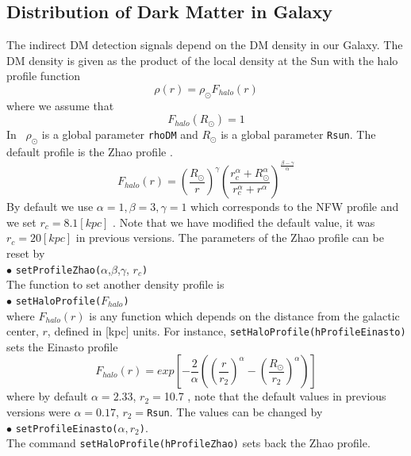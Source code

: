 \documentclass[12pt,a4paper]{article}
\begin{document}
\subsection{Distribution of Dark Matter  in Galaxy}
The indirect DM detection signals depend on the DM density in our Galaxy.
The DM density is given as the product of the local density at the Sun with the halo profile function 
\begin{equation}
\rho(r)=\rho_\odot F_{halo}(r)
\end{equation}
where we assume that
\begin{equation}
   F_{halo}(R_\odot)=1
\end{equation} 
In \micro\, $\rho_\odot$ is a global parameter {\tt rhoDM} and $R_\odot$ is a global parameter {\tt Rsun}.
  The default profile is the  Zhao  profile  \cite{Zhao:1995cp}.
\begin{equation}
\label{rho}
F_{halo}(r)=\left(\frac{ R_\odot}{r}\right)^{\gamma}
\left(\frac{r_c^{\alpha}+ R_\odot^{\alpha}}
{r_c^{\alpha}+r^{\alpha}}\right)^{\frac{\beta -\gamma}{\alpha}}
\end{equation}
By default we use $\alpha=1,\beta=3,\gamma=1$ which corresponds to the NFW profile and we set  $r_c=8.1[kpc]$ \cite{Lin:2019yux}. Note that we have modified the default value, it was  $r_c=20[kpc]$ in previous versions.
 The parameters of the Zhao profile  can be reset by\\ 
\noindent
$\bullet$ \verb|setProfileZhao(|$\alpha$,$\beta$,$\gamma$, $r_c$\verb|)|\\
The function to set another  density profile is\\ 
\noindent
$\bullet$ \verb|setHaloProfile(|$F_{halo}$\verb|)|\\
where $F_{halo}(r)$ is any function which depends on the distance from the galactic center,  $r$,
 defined   in [kpc] units.
For instance, \verb|setHaloProfile(hProfileEinasto)|  sets the Einasto profile\\
\begin{equation}
F_{halo}(r)=exp\left[-\frac{2}{\alpha}\left(\left(\frac{r}{r_2}\right)^{\alpha}- \left(\frac{R_\odot}{r_2}\right)^{\alpha}    \right)\right]
\end{equation}
where by default $\alpha=2.33$, $r_2=$10.7 \cite{Jiao:2023aci},  note that the default values in previous versions were $\alpha=0.17$, $r_2=${\tt Rsun}. The values   can be changed by \\ 
\noindent
$\bullet$ \verb|setProfileEinasto(|$\alpha, r_2$\verb|)|. \\
The command \verb|setHaloProfile(hProfileZhao)| sets back the Zhao profile.
\end{document}
